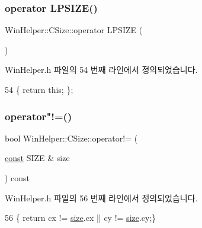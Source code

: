 \subsubsection{\texorpdfstring{operator L\+P\+S\+I\+Z\+E()}{operator LPSIZE()}}
{\footnotesize\ttfamily Win\+Helper\+::\+C\+Size\+::operator L\+P\+S\+I\+ZE (\begin{DoxyParamCaption}{ }\end{DoxyParamCaption})\hspace{0.3cm}{\ttfamily [inline]}}



Win\+Helper.\+h 파일의 54 번째 라인에서 정의되었습니다.


\begin{DoxyCode}
54 \{ \textcolor{keywordflow}{return} \textcolor{keyword}{this}; \};
\end{DoxyCode}
\mbox{\label{class_win_helper_1_1_c_size_a745dfa0f95195b3120b6aba2f2346d93}} 
\subsubsection{\texorpdfstring{operator"!=()}{operator!=()}}
{\footnotesize\ttfamily bool Win\+Helper\+::\+C\+Size\+::operator!= (\begin{DoxyParamCaption}\item[{\mbox{\hyperlink{getopt1_8c_a2c212835823e3c54a8ab6d95c652660e}{const}} S\+I\+ZE \&}]{size }\end{DoxyParamCaption}) const\hspace{0.3cm}{\ttfamily [inline]}}



Win\+Helper.\+h 파일의 56 번째 라인에서 정의되었습니다.


\begin{DoxyCode}
56 \{ \textcolor{keywordflow}{return} cx != \mbox{\hyperlink{expr-lex_8cpp_ab7d671599a7b25ca99a487fa341bc33a}{size}}.cx || cy != \mbox{\hyperlink{expr-lex_8cpp_ab7d671599a7b25ca99a487fa341bc33a}{size}}.cy;\}
\end{DoxyCode}
\mbox{\label{class_win_helper_1_1_c_size_a16db5b403ae9c1b8aaff262dba25c5aa}} 
